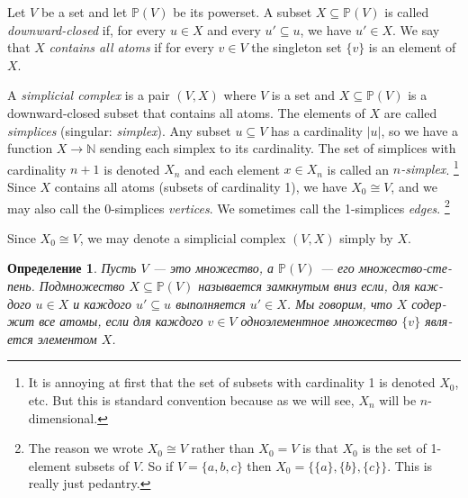 \documentclass[a4paper]{book}
\def\PP{{\mathbb P}}
\def\NN{{\mathbb N}}
\def\to{\rightarrow}
\def\ss{\subseteq}
\def\iso{\cong}
\theoremstyle{myth}
\newtheorem{definitionENG}[envENG]{\begin{english}Definition\end{english}}
\newtheorem{definitionRUS}[envRUS]{Определение}
\begin{document}
\begin{russian}
\begin{definitionENG}\label{def:simplicial complex}
Let $V$ be a set and let $\PP(V)$ be its powerset. A subset $X\ss\PP(V)$ is called {\em downward-closed} if, for every $u\in X$ and every $u'\ss u$, we have $u'\in X$. We say that $X$ {\em contains all atoms} if for every $v\in V$ the singleton set $\{v\}$ is an element of $X$. 

A {\em simplicial complex} is a pair $(V,X)$ where $V$ is a set and $X\ss\PP(V)$ is a downward-closed subset that contains all atoms. The elements of $X$ are called {\em simplices} (singular: {\em simplex}). Any subset $u\ss V$ has a cardinality $|u|$, so we have a function $X\to\NN$ sending each simplex to its cardinality. The set of simplices with cardinality $n+1$ is denoted $X_n$ and each element $x\in X_n$ is called an {\em $n$-simplex}.%
\footnote{It is annoying at first that the set of subsets with cardinality 1 is denoted $X_0$, etc. But this is standard convention because as we will see, $X_n$ will be $n$-dimensional.}
Since $X$ contains all atoms (subsets of cardinality 1), we have $X_0\iso V$, and we may also call the 0-simplices {\em vertices}. We sometimes call the 1-simplices {\em edges}.%
\footnote{The reason we wrote $X_0\iso V$ rather than $X_0=V$ is that $X_0$ is the set of 1-element subsets of $V$. So if $V=\{a,b,c\}$ then $X_0=\{\{a\},\{b\},\{c\}\}$. This is really just pedantry.}

Since $X_0\iso V$, we may denote a simplicial complex $(V,X)$ simply by $X$.
\end{definitionENG}

\begin{definitionRUS}\label{def:simplicial complex}
Пусть $V$ — это множество, а $\PP(V)$ — его множество-степень. Подмножество $X\ss\PP(V)$ называется {\em замкнутым вниз} если, для каждого $u\in X$ и каждого $u'\ss u$ выполняется $u'\in X$. Мы говорим, что $X$ {\em содержит все атомы}, если для каждого $v\in V$ одноэлементное множество $\{v\}$ является элементом $X$. 


\end{definitionRUS}
\end{russian}
\end{document}
